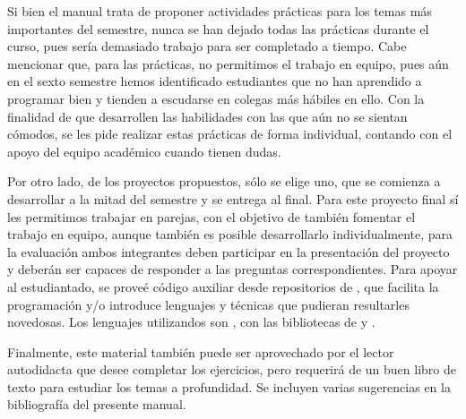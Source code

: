 Si bien el manual trata de proponer actividades prácticas para los temas más importantes del semestre, nunca se han dejado todas las prácticas durante el curso, pues sería demasiado trabajo para ser completado a tiempo.   Cabe mencionar que, para las prácticas, no permitimos el trabajo en equipo, pues aún en el sexto semestre hemos identificado estudiantes que no han aprendido a programar bien y tienden a escudarse en colegas más hábiles en ello.  Con la finalidad de que desarrollen las habilidades con las que aún no se sientan cómodos, se les pide realizar estas prácticas de forma individual, contando con el apoyo del equipo académico cuando tienen dudas.

Por otro lado, de los proyectos propuestos, sólo se elige uno, que se comienza a desarrollar a la mitad del semestre y se entrega al final.  Para este proyecto final sí les permitimos trabajar en parejas, con el objetivo de también fomentar el trabajo en equipo, aunque también es posible desarrollarlo individualmente, para la evaluación ambos integrantes deben participar en la presentación del proyecto y deberán ser capaces de responder a las preguntas correspondientes.  Para apoyar al estudiantado, se proveé código auxiliar desde repositorios de , que facilita la programación y/o introduce lenguajes y técnicas que pudieran resultarles novedosas.  Los lenguajes utilizandos son \Java, con las bibliotecas de  y \Python.

Finalmente, este material también puede ser aprovechado por el lector autodidacta que desee completar los ejercicios, pero requerirá de un buen libro de texto para estudiar los temas a profundidad.  Se incluyen varias sugerencias en la bibliografía del presente manual.

